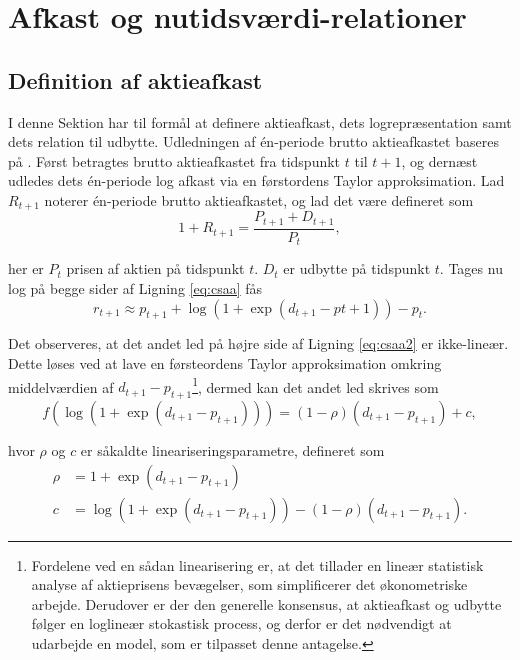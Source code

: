 \documentclass[
  a4paper,
  oneside]{memoir}
\begin{document}
\hypertarget{afkast-og-nutidsvuxe6rdi-relationer}{%
\section{Afkast og nutidsværdi-relationer}\label{afkast-og-nutidsvuxe6rdi-relationer}}

\hypertarget{defaktafk}{%
\subsection{Definition af aktieafkast}\label{defaktafk}}

I denne Sektion har til formål at definere aktieafkast, dets logrepræsentation samt dets relation til udbytte. Udledningen af én-periode brutto aktieafkastet baseres på \citep{Campbell1988}. Først betragtes brutto aktieafkastet fra tidspunkt \(t\) til \(t+1\), og dernæst udledes dets én-periode log afkast via en førstordens Taylor approksimation. Lad \(R_{t+1}\) noterer én-periode brutto aktieafkastet, og lad det være defineret som
\begin{equation}
1+R_{t+1}=\frac{P_{t+1}+D_{t+1}}{P_t}, \label{eq:csaa}
\end{equation}

her er \(P_t\) prisen af aktien på tidspunkt \(t\). \(D_t\) er udbytte på tidspunkt \(t\). Tages nu log på begge sider af Ligning \eqref{eq:csaa} fås
\begin{equation}
r_{t+1}\approx p_{t+1}+\log(1+\exp(d_{t+1}-p{t+1}))-p_t. \label{eq:csaa2}
\end{equation}

Det observeres, at det andet led på højre side af Ligning \eqref{eq:csaa2} er ikke-lineær. Dette løses ved at lave en førsteordens Taylor approksimation omkring middelværdien af \(d_{t+1}-p_{t+1}\)\footnote{Fordelene ved en sådan linearisering er, at det tillader en lineær statistisk analyse af aktieprisens bevægelser, som simplificerer det økonometriske arbejde. Derudover er der den generelle konsensus, at aktieafkast og udbytte følger en loglineær stokastisk process, og derfor er det nødvendigt at udarbejde en model, som er tilpasset denne antagelse.}, dermed kan det andet led skrives som
\begin{equation}
f(\log(1+\exp(d_{t+1}-p_{t+1}))) = (1-\rho)(d_{t+1}-p_{t+1}) + c, \label{eq:csaa3}
\end{equation}

hvor \(\rho\) og \(c\) er såkaldte lineariseringsparametre, defineret som
\begin{align*}
\rho&=1+\exp(d_{t+1}-p_{t+1})\\
c&=\log(1+\exp(d_{t+1}-p_{t+1}))-(1-\rho)(d_{t+1}-p_{t+1}).
\end{align*}
\end{document}
